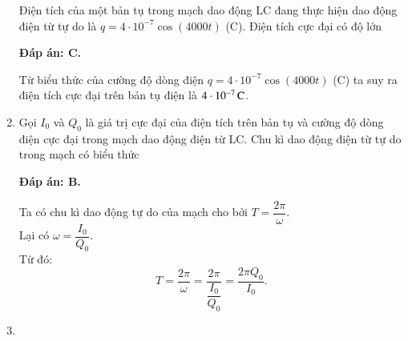 \begin{enumerate}[label=\bfseries Câu \arabic*:]
	{Điện tích của một bản tụ trong mạch dao động LC đang thực hiện dao động điện từ tự do là $q = 4\cdot10^{-7} \cos \left( 4000t \right)$ (C). Điện tích cực đại có độ lớn
	}
	
	\hideall
	{		\textbf{Đáp án: C.}
		
		Từ biểu thức của cường độ dòng điện $q = 4\cdot10^{-7} \cos \left( 4000t \right)$ (C) ta suy ra điện tích cực đại trên bản tụ điện là $\xsi{4\cdot10^{-7}}{C}$.
		
	}
	
	\item {}
	
	{Gọi $I_0$ và $Q_0$ là giá trị cực đại của điện tích trên bản tụ và cường độ dòng điện cực đại trong mạch dao động điện từ LC. Chu kì dao động điện từ tự do trong mạch có biểu thức
	}
	
	\hideall
	{		\textbf{Đáp án: B.}
		
		Ta có chu kì dao động tự do của mạch cho bởi $T = \dfrac{2\pi}{\omega}$. \\
		Lại có $\omega = \dfrac{I_0}{Q_0}$. \\
		Từ đó:
		$$T = \dfrac{2\pi}{\omega} = \dfrac{2\pi}{\dfrac{I_0}{Q_0}} = \dfrac{2\pi Q_0}{I_0}.$$
		
	}
	
	\item {}
	

\end{enumerate}

